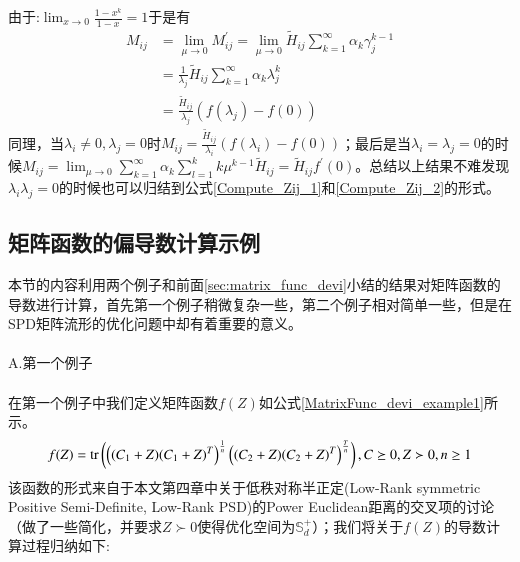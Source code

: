 由于:$\lim_{x\rightarrow 0}\frac{1-x^{k}}{1-x}=1$于是有
\begin{equation}
\label{ZerosEig_direction_gradient_M_1_1}
\begin{split}
M_{ij}&=\lim_{\mu \rightarrow 0} M_{ij}^{\prime}=\lim_{\mu \rightarrow 0} \tilde{H}_{ij}\sum_{k=1}^{\infty}\alpha_{k}\gamma_{j}^{k-1}\\
&=\frac{1}{\lambda_{j}}\tilde{H}_{ij}\sum_{k=1}^{\infty}\alpha_{k}\lambda_{j}^{k}\\
&=\frac{\tilde{H}_{ij}}{\lambda_{j}}(f(\lambda_{j})-f(0))
\end{split}
\end{equation}
同理，当$\lambda_i \neq 0,\lambda_j =0$时$M_{ij}=\frac{\tilde{H}_{ij}}{\lambda_{i}}(f(\lambda_{i})-f(0))$；最后是当$\lambda_i=\lambda_j=0$的时候$M_{ij}=\lim_{\mu \rightarrow 0}\sum_{k=1}^{\infty} \alpha_{k}\sum_{l=1}^{k}k\mu^{k-1}\tilde{H}_{ij}=\tilde{H}_{ij}f^{\prime}(0)$。总结以上结果不难发现$\lambda_i \lambda_j=0$的时候也可以归结到公式\ref{Compute_Zij_1}和\ref{Compute_Zij_2}的形式。
\subsection{矩阵函数的偏导数计算示例}
\label{sec:matrix_func_devi_examples}
本节的内容利用两个例子和前面\ref{sec:matrix_func_devi}小结的结果对矩阵函数的导数进行计算，首先第一个例子稍微复杂一些，第二个例子相对简单一些，但是在SPD矩阵流形的优化问题中却有着重要的意义。\\\\
{\heiti A.第一个例子}\\\\
在第一个例子中我们定义矩阵函数$f(Z)$如公式\ref{MatrixFunc_devi_example1}所示。
\begin{equation}
\label{MatrixFunc_devi_example1}
f(Z)={\rm tr}\left(\left((C_1+Z)(C_1+Z)^{T}\right)^{\frac{1}{n}}\left((C_2+Z)(C_2+Z)^{T}\right)^{\frac{T}{n}}\right),C\succeq 0,Z\succ 0,n\geq 1
\end{equation}
该函数的形式来自于本文第四章中关于低秩对称半正定(Low-Rank symmetric Positive Semi-Definite, Low-Rank PSD)的Power Euclidean距离的交叉项的讨论（做了一些简化，并要求$Z \succ 0$使得优化空间为$\mathbb{S}_{d}^{+}$）；我们将关于$f(Z)$的导数计算过程归纳如下:

